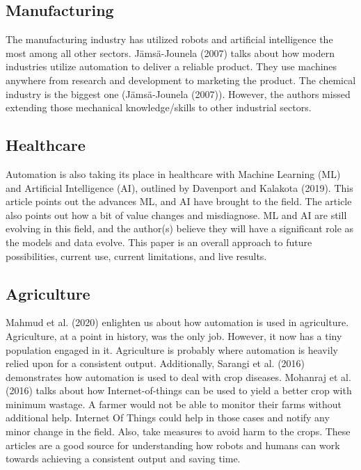 \documentclass[
  man,floatsintext]{apa7}
\begin{document}
\hypertarget{manufacturing}{%
\subsection{Manufacturing}\label{manufacturing}}

The manufacturing industry has utilized robots and artificial intelligence the most among all other sectors. Jämsä-Jounela (2007) talks about how modern industries utilize automation to deliver a reliable product. They use machines anywhere from research and development to marketing the product. The chemical industry is the biggest one (Jämsä-Jounela (2007)). However, the authors missed extending those mechanical knowledge/skills to other industrial sectors.

\hypertarget{healthcare}{%
\subsection{Healthcare}\label{healthcare}}

Automation is also taking its place in healthcare with Machine Learning (ML) and Artificial Intelligence (AI), outlined by Davenport and Kalakota (2019). This article points out the advances ML, and AI have brought to the field. The article also points out how a bit of value changes and misdiagnose. ML and AI are still evolving in this field, and the author(s) believe they will have a significant role as the models and data evolve. This paper is an overall approach to future possibilities, current use, current limitations, and live results.

\hypertarget{agriculture}{%
\subsection{Agriculture}\label{agriculture}}

Mahmud et al. (2020) enlighten us about how automation is used in agriculture. Agriculture, at a point in history, was the only job. However, it now has a tiny population engaged in it. Agriculture is probably where automation is heavily relied upon for a consistent output. Additionally, Sarangi et al. (2016) demonstrates how automation is used to deal with crop diseases. Mohanraj et al. (2016) talks about how Internet-of-things can be used to yield a better crop with minimum wastage. A farmer would not be able to monitor their farms without additional help. Internet Of Things could help in those cases and notify any minor change in the field. Also, take measures to avoid harm to the crops. These articles are a good source for understanding how robots and humans can work towards achieving a consistent output and saving time.
\end{document}
